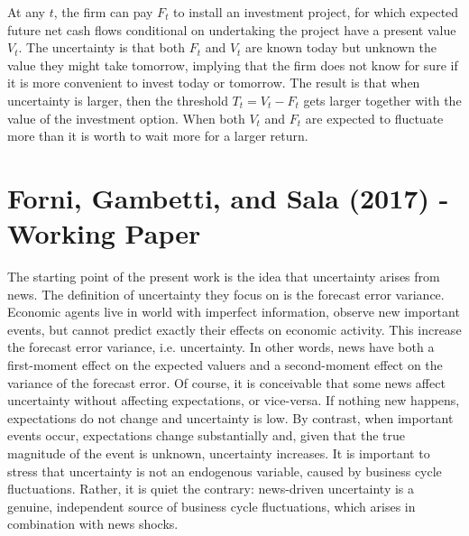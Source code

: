 \documentclass{article}
\begin{document}
{At any $t$, the firm can pay $F_t$ to install an investment project, for which expected future net cash flows conditional on undertaking the project have a present value $V_t$. The uncertainty is that both $F_t$ and $V_t$ are known today but unknown the value they might take tomorrow, implying that the firm does not know for sure if it is more convenient to invest today or tomorrow. The result is that when uncertainty is larger, then the threshold $T_t = V_t - F_t$ gets larger together with the value of the investment option. When both $V_t$ and $F_t$ are expected to fluctuate more than it is worth to wait more for a larger return. 

\section*{Forni, Gambetti, and Sala (2017) - Working Paper}

The starting point of the present work is the idea that uncertainty arises from news. The definition of uncertainty they focus on is the forecast error variance. Economic agents live in world with imperfect information, observe new important events, but cannot predict exactly their effects on economic activity. This increase the forecast error variance, i.e. uncertainty. In other words, news have both a first-moment effect on the expected valuers and a second-moment effect on the variance of the forecast error. Of course, it is conceivable that some news affect uncertainty without affecting expectations, or vice-versa. If nothing new happens, expectations do not change and uncertainty is low. By contrast, when important events occur, expectations change substantially and, given that the true magnitude of the event is unknown, uncertainty increases. It is important to stress that uncertainty is not an endogenous variable, caused by business cycle fluctuations. Rather, it is quiet the contrary: news-driven uncertainty is a genuine, independent source of business cycle fluctuations, which arises in combination with news shocks.

}
\end{document}
